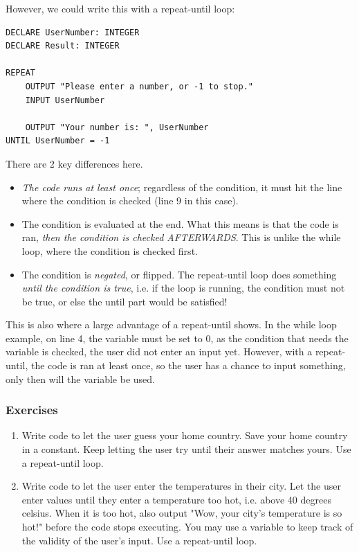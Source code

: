 \documentclass[./main.tex]{subfiles}
\begin{document}
However, we could write this with a repeat-until loop:

\begin{verbatim}
DECLARE UserNumber: INTEGER
DECLARE Result: INTEGER

REPEAT 
    OUTPUT "Please enter a number, or -1 to stop."
    INPUT UserNumber

    OUTPUT "Your number is: ", UserNumber
UNTIL UserNumber = -1
\end{verbatim}

There are 2 key differences here.

\begin{itemize}
    \item \emph{The code runs at least once}; regardless of the condition, it must hit the line where the condition is checked (line 9 in this case).
    \item The condition is evaluated at the end. What this means is that the code is ran, \emph{then the condition is checked AFTERWARDS}. This is unlike the while loop, where the condition is checked first.
    \item The condition is \emph{negated}, or flipped. The repeat-until loop does something \emph{until the condition is true}, i.e. if the loop is running, the condition must not be true, or else the until part would be satisfied!
\end{itemize}

This is also where a large advantage of a repeat-until shows. In the while loop example, on line 4, the variable must be set to 0, as the condition that needs the variable is checked, the user did not enter an input yet. However, with a repeat-until, the code is ran at least once, so the user has a chance to input something, only then will the variable be used.

\subsubsection{Exercises}
\label{ex:2_4_1}

\begin{enumerate}
    \item Write code to let the user guess your home country. Save your home country in a constant. Keep letting the user try until their answer matches yours. Use a repeat-until loop.
        \largelines
        \newpage
    \item Write code to let the user enter the temperatures in their city. Let the user enter values until they enter a temperature too hot, i.e. above 40 degrees celsius. When it is too hot, also output "Wow, your city's temperature is so hot!" before the code stops executing. You may use a variable to keep track of the validity of the user's input. Use a repeat-until loop.
        \largelines
\end{enumerate}
\end{document}
